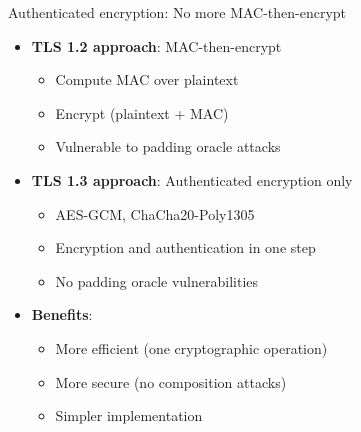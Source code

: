 \documentclass[aspectratio=169, lualatex, handout]{beamer}
\begin{document}
\begin{frame}{Authenticated encryption: No more MAC-then-encrypt}
	\begin{itemize}[<+->]
		\item \textbf{TLS 1.2 approach}: MAC-then-encrypt
		      \begin{itemize}
			      \item Compute MAC over plaintext
			      \item Encrypt (plaintext + MAC)
			      \item Vulnerable to padding oracle attacks
		      \end{itemize}
		\item \textbf{TLS 1.3 approach}: Authenticated encryption only
		      \begin{itemize}
			      \item AES-GCM, ChaCha20-Poly1305
			      \item Encryption and authentication in one step
			      \item No padding oracle vulnerabilities
		      \end{itemize}
		\item \textbf{Benefits}:
		      \begin{itemize}
			      \item More efficient (one cryptographic operation)
			      \item More secure (no composition attacks)
			      \item Simpler implementation
		      \end{itemize}
	\end{itemize}
\end{frame}
\end{document}
